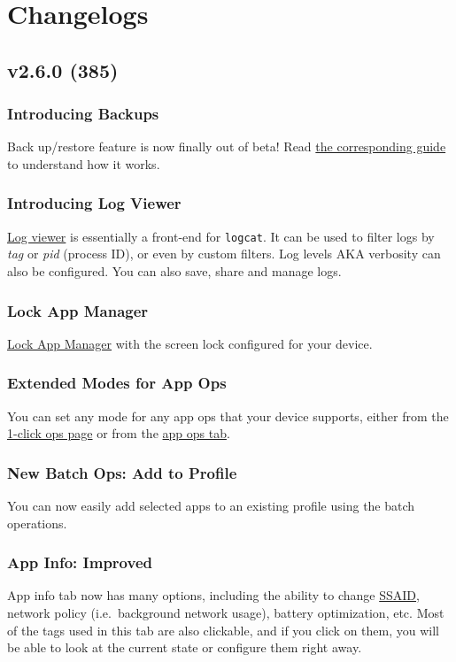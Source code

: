 \chapter{Changelogs}\label{ch:changelogs} %


\section{v2.6.0 (385)}\label{sec:v2.6.0-(385)}

\subsection{Introducing Backups}
Back up/restore feature is now finally out of beta!
Read \hyperref[sec:backup-restore]{the corresponding guide} to understand how it works.

\subsection{Introducing Log Viewer}
\hyperref[subsubsec:log-viewer]{Log viewer} is essentially a front-end for \texttt{logcat}.
It can be used to filter logs by \textit{tag} or \textit{pid} (process ID), or even by custom filters.
Log levels AKA verbosity can also be configured.
You can also save, share and manage logs.

\subsection{Lock App Manager}
\hyperref[subsec:screen-lock]{Lock App Manager} with the screen lock configured for your device.

\subsection{Extended Modes for App Ops}
You can set any mode for any app ops that your device supports, either from the
\hyperref[subsec:set-mode-for-app-ops-dots]{1-click ops page} or from the \hyperref[subsubsec:app-ops]{app ops tab}.

\subsection{New Batch Ops: Add to Profile}
You can now easily add selected apps to an existing profile using the batch operations.

\subsection{App Info: Improved}
App info tab now has many options, including the ability to change \hyperref[sec:terminologies]{SSAID}, network policy
(i.e.\ background network usage), battery optimization, etc.
Most of the tags used in this tab are also clickable, and if you click on them, you will be able to look at the current
state or configure them right away.


